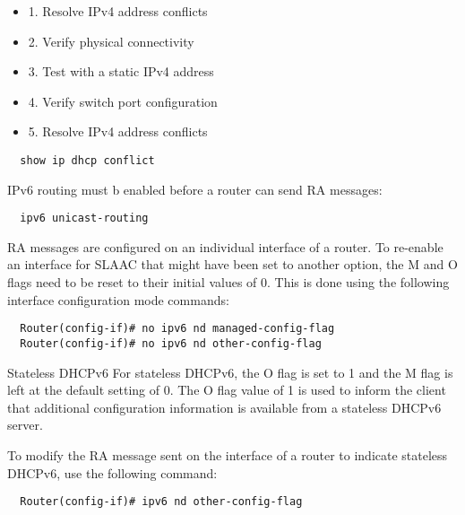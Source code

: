 \documentclass[../EngineeringJournal_CDavis.tex]{subfiles}
\begin{document}
\hspace{0.2cm}
\begin{tcolorbox}[width=6.3in]
\scriptsize 
  \begin{itemize}
\item{1.} Resolve IPv4 address conflicts
\item{2.} Verify physical connectivity
\item{3.} Test with a static IPv4 address
\item{4.} Verify switch port configuration
\item{5.}  Resolve IPv4 address conflicts
  \end{itemize}
  \begin{verbatim}
  show ip dhcp conflict
  \end{verbatim}
\end{tcolorbox}
\hspace{0.2cm}
\normalsize  




\hspace{0.2cm}
\begin{tcolorbox}[width=6.3in]
\scriptsize 
  IPv6 routing must b enabled before a router can send RA messages:
  \begin{verbatim}
  ipv6 unicast-routing
  \end{verbatim}
  RA messages are configured on an individual interface of a router. 
  To re-enable an interface for SLAAC that might have been set to 
  another option, the M and O flags need to be reset to their initial 
  values of 0. This is done using the following interface 
  configuration mode commands:
  \begin{verbatim}
  Router(config-if)# no ipv6 nd managed-config-flag 
  Router(config-if)# no ipv6 nd other-config-flag 
  \end{verbatim}
\end{tcolorbox}
\hspace{0.2cm}
\normalsize  




\hspace{0.2cm}
\begin{tcolorbox}[width=6.3in]
Stateless DHCPv6
\scriptsize 
For stateless DHCPv6, the O flag is set to 1 and the M flag is left at 
the default setting of 0. The O flag value of 1 is used to inform the 
client that additional configuration information is available from a 
stateless DHCPv6 server.

To modify the RA message sent on the interface of a router to indicate 
stateless DHCPv6, use the following command:
  \begin{verbatim}
  Router(config-if)# ipv6 nd other-config-flag 
  \end{verbatim}
\end{tcolorbox}
\hspace{0.2cm}
\normalsize  
\end{document}
